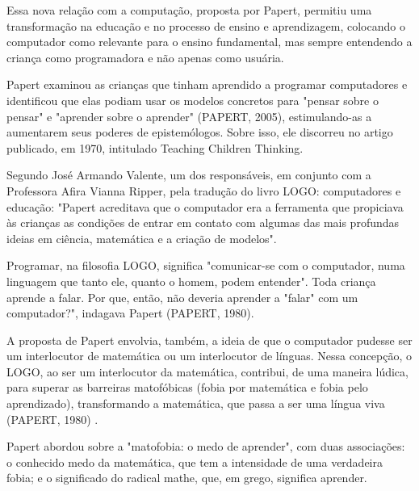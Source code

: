 Essa nova relação com a computação, proposta por Papert, permitiu uma transformação na educação e no processo de ensino e aprendizagem, colocando o computador como relevante para o ensino fundamental, mas sempre entendendo a criança como programadora e não apenas como usuária.

Papert examinou as crianças que tinham aprendido a programar computadores e identificou que elas podiam usar os modelos concretos para "pensar sobre o pensar" e "aprender sobre o aprender"  (PAPERT, 2005), estimulando-as  a aumentarem seus poderes de epistemólogos. Sobre isso, ele discorreu no artigo publicado, em 1970, intitulado Teaching Children Thinking.

Segundo José Armando Valente, um dos responsáveis, em conjunto com a Professora Afira Vianna Ripper, pela tradução do livro LOGO: computadores e educação: "Papert acreditava que o computador era a ferramenta que propiciava às crianças as condições de entrar em contato com algumas das mais profundas ideias em ciência, matemática e a criação de modelos".

Programar, na filosofia LOGO, significa "comunicar-se com o computador, numa linguagem que tanto ele, quanto o homem,  podem entender". Toda criança aprende a falar. Por que, então, não deveria aprender a "falar" com um computador?", indagava Papert  (PAPERT, 1980).

A proposta de Papert envolvia, também, a ideia de que o computador pudesse ser um interlocutor  de matemática ou um interlocutor de línguas. Nessa concepção, o LOGO, ao ser um interlocutor da matemática, contribui, de uma maneira lúdica, para superar as barreiras matofóbicas (fobia por matemática e fobia pelo aprendizado), transformando a matemática, que passa a ser uma língua viva (PAPERT, 1980) .

Papert abordou sobre a "matofobia: o medo de aprender", com duas associações: o conhecido medo da matemática, que tem a intensidade de uma verdadeira fobia; e o  significado do radical mathe, que, em grego, significa aprender.


\noindent\begin{center}\mbox{\centering{}}\end{center}


